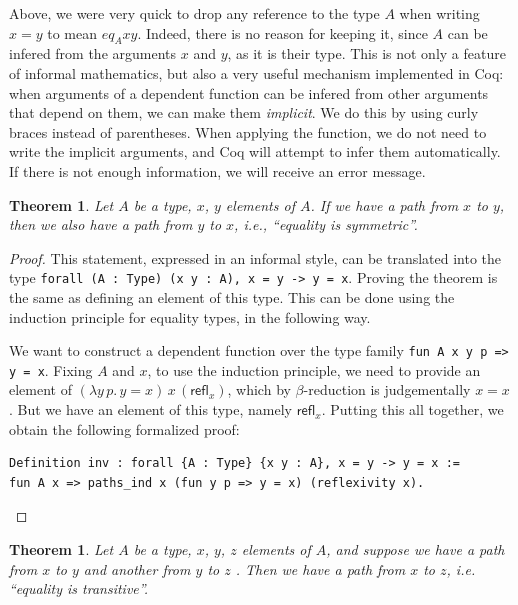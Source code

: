 \documentclass[12 pt]{amsart}
\newtheorem{theorem}[subsubsection]{Theorem}
\theoremstyle{definition}
\theoremstyle{remark}
\newcommand{\refl}{\mathsf{refl}}
\begin{document}
Above, we were very quick to drop any reference to the type $A$ when writing $x = y$ to mean $eq_A x y$. Indeed, there is no reason for keeping it, since $A$ can be infered from the arguments $x$ and $y$, as it is their type. This is not only a feature of informal mathematics, but also a very useful mechanism implemented in Coq: when arguments of a dependent function can be infered from other arguments that depend on them, we can make them \textit{implicit}. We do this by using curly braces instead of parentheses. When applying the function, we do not need to write the implicit arguments, and Coq will attempt to infer them automatically. If there is not enough information, we will receive an error message.

\begin{theorem}
    Let $A$ be a type, $x$, $y$ elements of $A$. If we have a path from $x$ to $y$, then we also have a path from $y$ to $x$, i.e., ``equality is symmetric''.
\end{theorem}

\begin{proof}
This statement, expressed in an informal style, can be translated into the type \texttt{forall (A : Type) (x y : A), x = y -> y = x}. Proving the theorem is the same as defining an element of this type. This can be done using the induction principle for equality types, in the following way.

We want to construct a dependent function over the type family \texttt{fun A x y p => y = x}. Fixing $A$ and $x$, to use the induction principle, we need to provide an element of $(\lambda y \,p.\, y = x) \,x \,(\refl_x)$, which by $\beta$-reduction is judgementally $x = x$. But we have an element of this type, namely $\refl_x$. Putting this all together, we obtain the following formalized proof:

\begin{lstlisting}
Definition inv : forall {A : Type} {x y : A}, x = y -> y = x :=
fun A x => paths_ind x (fun y p => y = x) (reflexivity x).
\end{lstlisting}
\end{proof}



\begin{theorem}
Let $A$ be a type, $x$, $y$, $z$ elements of $A$, and suppose we have a path from $x$ to $y$ and another from $y$ to $z$ . Then we have a path from $x$ to $z$, i.e. ``equality is transitive''.
\end{theorem}
\end{document}
